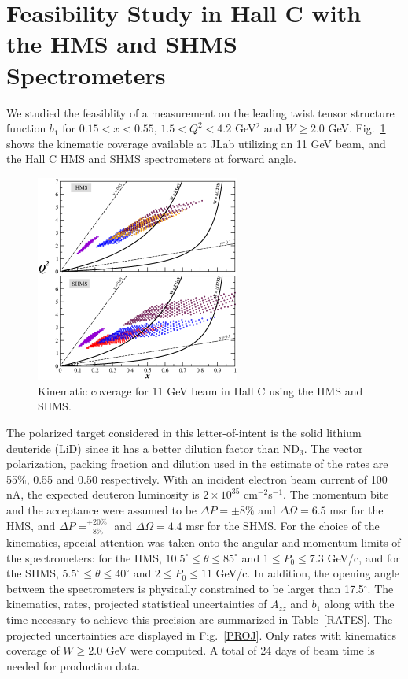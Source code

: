 \appendix

\section{Feasibility Study in Hall C with the HMS and SHMS Spectrometers}

We studied the feasiblity of a measurement on the leading twist tensor structure 
function $b_1$ for $0.15<x<0.55$, $1.5<Q^2<4.2$ GeV$^2$ and $W \ge 2.0$ GeV. Fig.~\ref{kincov} 
shows the kinematic coverage available at JLab utilizing an 11 GeV beam, and the Hall C HMS 
and SHMS spectrometers at forward angle. 

\begin{figure}[h]
\begin{center}
\includegraphics[width=0.6\textwidth]{figs/hallc/cov_split.eps}
\caption{\label{kincov} Kinematic coverage for 11 GeV beam in Hall C using the HMS and SHMS.}
\end{center}
\end{figure}

The polarized target considered in this letter-of-intent is the solid lithium deuteride (LiD) 
since it has a better dilution factor than ND$_3$. The vector polarization, packing fraction and 
dilution used in the estimate of the rates are 55\%, 0.55 and 0.50 respectively. With an incident 
electron beam current of 100 nA, the 
expected deuteron luminosity is $2\times 10^{35}$ cm$^{-2}$s$^{-1}$. The momentum bite and the acceptance 
were assumed to be $\Delta P = \pm 8\%$ and $\Delta\Omega = 6.5$ msr for the HMS, and $\Delta P 
= ^{+20\%}_{-8\%}$ and $\Delta\Omega =4.4$ msr for the SHMS. For the choice of the kinematics, 
special attention was taken onto the angular and momentum limits of the spectrometers: for the 
HMS, $10.5^{\circ} \le \theta \le 85^{\circ}$ and $1 \le P_0 \le 7.3$ GeV/c, and for the SHMS, 
$5.5^{\circ} \le \theta \le 40^{\circ}$ and $2 \le P_0 \le 11$ GeV/c. In addition, the 
opening angle between the spectrometers is physically constrained to be larger than 17.5$^{\circ}$. 
The kinematics, rates, projected 
statistical uncertainties of $A_{zz}$ and $b_1$ along with the time necessary to achieve this
precision are summarized in Table~\ref{RATES}. The projected uncertainties are displayed in 
Fig.~\ref{PROJ}. Only rates with kinematics coverage of $W \ge 2.0$ GeV were computed. A 
total of 24 days of beam time is needed for production data.

